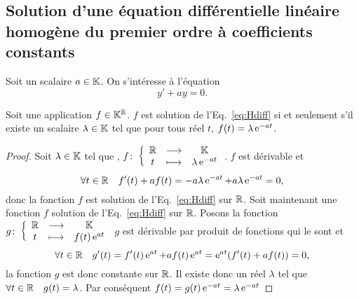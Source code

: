 \subsection{Solution d'une équation différentielle linéaire homogène du premier ordre à coefficients constants}
\label{subsec:solutioneqdifflinhomog1coefconstants}
Soit un scalaire $a \in \mathbb{K}$. On s'intéresse à l'équation 
\begin{equation}
\label{eq:Hdiff}
y'+ay=0.
\end{equation}
%
\begin{theo}
\label{theo:1}
Soit une application $f \in \mathbb{K}^{\mathbb{R}}$. $f$ est solution de l'Eq.~\eqref{eq:Hdiff} si et seulement s'il existe un scalaire $\lambda \in \mathbb{K}$ tel que pour tous réel $t$, $f(t)=\lambda \operatorname{e}^{-at}$.
\end{theo}
\begin{proof}
Soit $\lambda \in \mathbb{K}$ tel que , $f\colon \left\{\begin{array}{ccc} \mathbb{R} & \longrightarrow &\mathbb{K}\\ t & \longmapsto & \lambda \operatorname{e}^{-at} \end{array} \right.$. $f$ est dérivable et
\begin{equation}
\forall t \in \mathbb{R} \quad f'(t)+af(t)=-a \lambda \operatorname{e}^{-at}+a \lambda \operatorname{e}^{-at}=0,
\end{equation}
donc la fonction $f$ est solution de l'Eq.~\eqref{eq:Hdiff} sur $\mathbb{R}$. Soit maintenant une fonction $f$ solution de l'Eq.~\eqref{eq:Hdiff} sur $\mathbb{R}$. Posons la fonction $g\colon \left\{\begin{array}{ccc} \mathbb{R} & \longrightarrow &\mathbb{K}\\ t & \longmapsto & f(t)\operatorname{e}^{at} \end{array} \right.$ $g$ est dérivable par produit de fonctions qui le sont et
\begin{equation}
\forall t \in \mathbb{R} \quad g'(t)=f'(t)\operatorname{e}^{at} + af(t)\operatorname{e}^{at}=\operatorname{e}^{at}(f'(t)+af(t))=0,
\end{equation}
la fonction $g$ est donc constante sur $\mathbb{R}$. Il existe donc un réel $\lambda$ tel que $\forall t \in \mathbb{R} \quad g(t)=\lambda$. Par conséquent $f(t)=g(t)\operatorname{e}^{-at}=\lambda \operatorname{e}^{-at}$
\end{proof}
